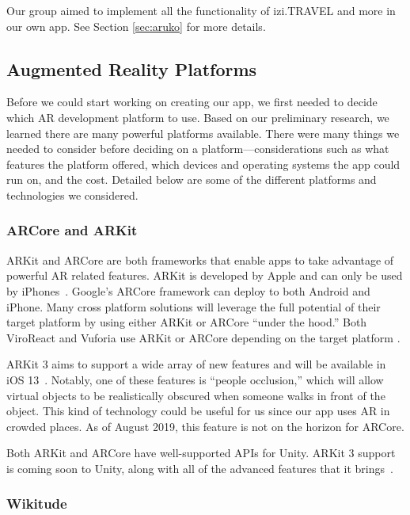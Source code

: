 \documentclass[a4paper, 10pt, american, titlepage]{article}
\begin{document}
Our group aimed to implement all the functionality of izi.TRAVEL and more in
our own app. See Section \ref{sec:aruko} for more details.

\subsection{Augmented Reality Platforms}
\label{sec:platforms}

Before we could start working on creating our app, we first needed to decide
which AR development platform to use. Based on our preliminary research, we
learned there are many powerful platforms available. There were many things we
needed to consider before deciding on a platform---considerations such as what
features the platform offered, which devices and operating systems the app could
run on, and the cost. Detailed below are some of the different platforms and
technologies we considered.

\subsubsection{ARCore and ARKit}
\label{sec:ARCoreAndARKit}

ARKit and ARCore are both frameworks that enable apps to take advantage of
powerful AR related features. ARKit is developed by Apple and can only be used
by iPhones~\autocite{summerson2018}. Google's ARCore framework can deploy to both
Android and iPhone. Many cross platform solutions will leverage the full
potential of their target platform by using either ARKit or ARCore ``under the
hood.'' Both ViroReact and Vuforia use ARKit or ARCore depending on the target
platform \autocites{vuforiaFusion}{moon2018}.

ARKit 3 aims to support a wide array of new features and will be available in
iOS 13~\autocite{apple2019}. Notably, one of these features is ``people
occlusion,'' which will allow virtual objects to be realistically obscured when
someone walks in front of the object. This kind of technology could be useful
for us since our app uses AR in crowded places. As of August 2019, this
feature is not on the horizon for ARCore.

Both ARKit and ARCore have well-supported APIs for Unity. ARKit 3 support is
coming soon to Unity, along with all of the advanced features that it
brings~\autocite{stinson2019}.

\subsubsection{Wikitude}
\label{sec:wikitude}
\end{document}
